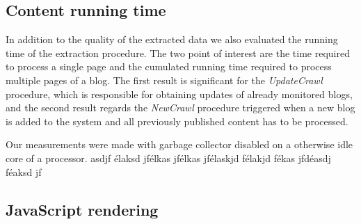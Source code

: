 \subsection{Content running time}

In addition to the quality of the extracted data we also evaluated the running time of the extraction procedure. The two point of interest are the time required to process a single page and the cumulated running time required to process multiple pages of a blog. The first result is significant for the \emph{UpdateCrawl} procedure, which is responsible for obtaining updates of already monitored blogs, and the second result regards the \emph{NewCrawl} procedure triggered when a new blog is added to the system and all previously published content has to be processed. 

Our measurements were made with garbage collector disabled on a otherwise idle core of a  processor.  asdjf élaksd jfélkas jfélkas jfélaskjd félakjd fékas jfdéasdj féaksd jf









\subsection{JavaScript rendering}






